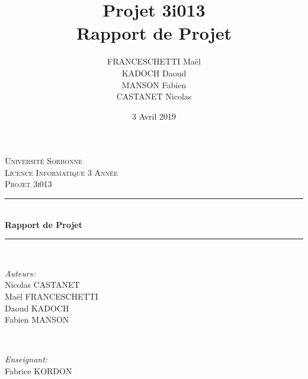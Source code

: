 \documentclass{article}
\date{3 Avril 2019}
\author{FRANCESCHETTI Maël\\KADOCH Daoud\\MANSON Fabien\\CASTANET Nicolas}
\title{\LARGE{Projet 3i013\\}Rapport de Projet}
\begin{document}
\begin{titlepage}

\newcommand{\HRule}{\rule{\linewidth}{0.5mm}} %

\center %
 

\textsc{\LARGE Université Sorbonne}\\[3cm] %
\textsc{\Large Licence Informatique 3 Année}\\[0.5cm] %
\textsc{\large Projet 3i013}\\[2cm] %


\HRule \\[0.4cm]
{ \huge \bfseries Rapport de Projet}\\[0.4cm] %
\HRule \\[2cm]
 

\begin{minipage}{0.4\textwidth}
	\begin{flushleft} \large
	\emph{Auteurs:}\\[0.2cm]
	Nicolas \textsc{CASTANET}\\ %
	Maël \textsc{FRANCESCHETTI}\\ %
	Daoud \textsc{KADOCH}\\ %
	Fabien \textsc{MANSON} %
	\end{flushleft}
\end{minipage}
~
\begin{minipage}{0.4\textwidth}
	\begin{flushright} \large
	\emph{Enseignant:} \\[0.2cm]
	Fabrice \textsc{KORDON}
	\end{flushright}
\end{minipage}\\[4cm]


\end{titlepage}
\end{document}
